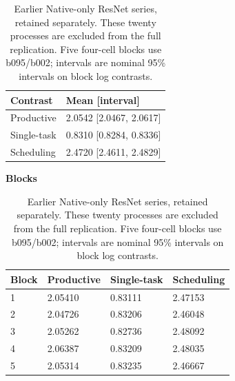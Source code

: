 \begin{table}[t]
\centering
\caption{Earlier Native-only ResNet series, retained separately. These twenty processes are excluded from the full replication. Five four-cell blocks use b095/b002; intervals are nominal 95\% intervals on block log contrasts.}
\label{tab:supp-scheduling-native-only}
\begingroup\small\setlength{\tabcolsep}{3pt}
\begin{tabular}{ll}
\toprule
Contrast & Mean [interval] \\
\midrule
Productive & 2.0542 [2.0467, 2.0617] \\
Single-task & 0.8310 [0.8284, 0.8336] \\
Scheduling & 2.4720 [2.4611, 2.4829] \\
\bottomrule
\end{tabular}
\par\smallskip\textbf{Blocks}\par\smallskip
\begin{tabular}{llll}
\toprule
Block & Productive & Single-task & Scheduling \\
\midrule
1 & 2.05410 & 0.83111 & 2.47153 \\
2 & 2.04726 & 0.83206 & 2.46048 \\
3 & 2.05262 & 0.82736 & 2.48092 \\
4 & 2.06387 & 0.83209 & 2.48035 \\
5 & 2.05314 & 0.83235 & 2.46667 \\
\bottomrule
\end{tabular}
\endgroup
\end{table}
